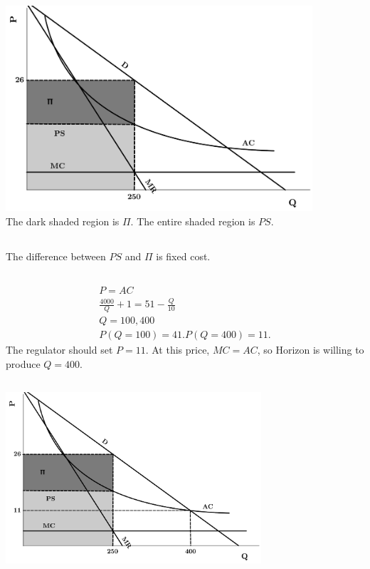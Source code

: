 \documentclass{article}
\begin{document}
	\subsection[d]{}
		\includegraphics[height=3in]{Charts/8d}\\
		The dark shaded region is $\Pi$. The entire shaded region is $PS$. 
	\subsection[e]{}
		The difference between $PS$ and $\Pi$ is fixed cost. 
	\subsection[f]{}
		\begin{align*}
			P=AC\\
			\frac{4000}{Q}+1 = 51- \frac{Q}{10}\\
			Q = {100,400}\\
			P(Q=100) = 41. P(Q=400) = 11.
		\end{align*}
		The regulator should set $P=11.$ At this price, $MC=AC$, so Horizon is willing to produce $Q=400$.
	\subsection[g]{}
		\includegraphics[height=2.5in]{Charts/8g}
\end{document}
